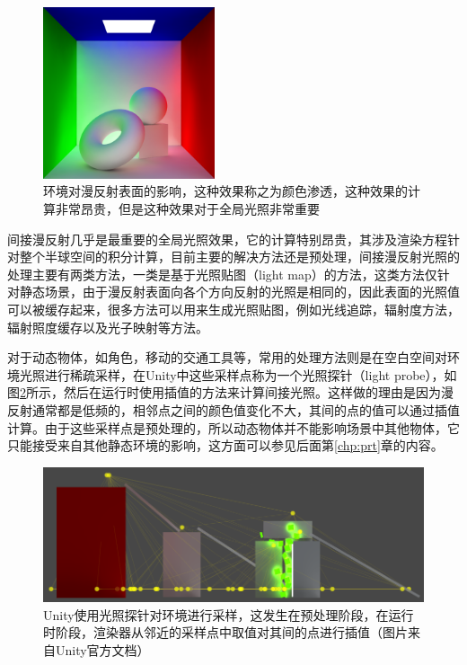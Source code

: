 \begin{figure}
\sidecaption
\includegraphics[width=0.45\textwidth]{figures/intro/indirect}	
\caption{环境对漫反射表面的影响，这种效果称之为颜色渗透，这种效果的计算非常昂贵，但是这种效果对于全局光照非常重要}
\label{f:intro-indirect}
\end{figure}

间接漫反射几乎是最重要的全局光照效果，它的计算特别昂贵，其涉及渲染方程针对整个半球空间的积分计算，目前主要的解决方法还是预处理，间接漫反射光照的处理主要有两类方法，一类是基于光照贴图（light map）的方法，这类方法仅针对静态场景，由于漫反射表面向各个方向反射的光照是相同的，因此表面的光照值可以被缓存起来，很多方法可以用来生成光照贴图，例如光线追踪，辐射度方法，辐射照度缓存以及光子映射等方法。

对于动态物体，如角色，移动的交通工具等，常用的处理方法则是在空白空间对环境光照进行稀疏采样，在Unity中这些采样点称为一个光照探针（light probe），如图\ref{f:intro-light-probe}所示，然后在运行时使用插值的方法来计算间接光照。这样做的理由是因为漫反射通常都是低频的，相邻点之间的颜色值变化不大，其间的点的值可以通过插值计算。由于这些采样点是预处理的，所以动态物体并不能影响场景中其他物体，它只能接受来自其他静态环境的影响，这方面可以参见后面第\ref{chp:prt}章的内容。

\begin{figure}
\includegraphics[width=\textwidth]{figures/intro/LightProbes}	
\caption{Unity使用光照探针对环境进行采样，这发生在预处理阶段，在运行时阶段，渲染器从邻近的采样点中取值对其间的点进行插值（图片来自Unity官方文档）}
\label{f:intro-light-probe}
\end{figure}



